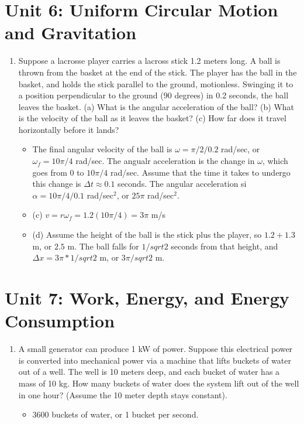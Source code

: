 \documentclass[10pt]{article}
\begin{document}
\section{Unit 6: Uniform Circular Motion and Gravitation}
\begin{enumerate}
\item Suppose a lacrosse player carries a lacross stick 1.2 meters long.  A ball is thrown from the basket at the end of the stick.  The player has the ball in the basket, and holds the stick parallel to the ground, motionless.  Swinging it to a position perpendicular to the ground (90 degrees) in 0.2 seconds, the ball leaves the basket.  (a) What is the angular acceleration of the ball?  (b) What is the velocity of the ball as it leaves the basket?  (c) How far does it travel horizontally before it lands?
\begin{itemize}
\item The final angular velocity of the ball is $\omega = \pi/2/0.2$ rad/sec, or $\omega_f = 10\pi/4$ rad/sec.  The angualr acceleration is the change in $\omega$, which goes from 0 to $10\pi/4$ rad/sec.  Assume that the time it takes to undergo this change is $\Delta t \approx 0.1$ seconds.  The angular acceleration si $\alpha = 10\pi/4/0.1$ rad/sec$^2$, or $25\pi$ rad/sec$^2$.
\item (c) $v = r\omega_f = 1.2 (10\pi/4) = 3\pi$ m/s
\item (d) Assume the height of the ball is the stick plus the player, so $1.2 + 1.3$ m, or $2.5$ m.  The ball falls for $1/sqrt{2}$ seconds from that height, and $\Delta x = 3\pi * 1/sqrt{2}$ m, or $3\pi/sqrt{2}$ m.
\end{itemize}
\end{enumerate}

\section{Unit 7: Work, Energy, and Energy Consumption}
\begin{enumerate}
\item A small generator can produce 1 kW of power.  Suppose this electrical power is converted into mechanical power via a machine that lifts buckets of water out of a well.  The well is 10 meters deep, and each bucket of water has a mass of 10 kg.  How many buckets of water does the system lift out of the well in one hour?  (Assume the 10 meter depth stays constant).
\begin{itemize}
\item 3600 buckets of water, or 1 bucket per second.
\end{itemize}
\end{enumerate}
\end{document}
